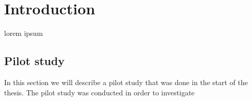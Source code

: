 \chapter{Introduction}
lorem ipsum

\section{Pilot study}

In this section we will describe a pilot study that was done in the start of the thesis. The pilot study was conducted in order to investigate